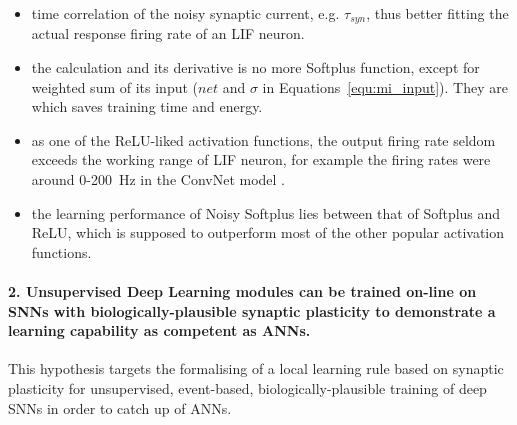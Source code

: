 	\begin{itemize}
		\item \DIFdelbegin {}\DIFdelend \DIFaddbegin {}\DIFaddend time correlation of the noisy synaptic current, e.g. $\tau_{syn}$, thus better fitting the actual response firing rate of an LIF neuron. %


		\item the calculation \DIFdelbegin {}\DIFdelend \DIFaddbegin {}\DIFaddend and its derivative is no more \DIFdelbegin {}\DIFdelend \DIFaddbegin {}\DIFaddend Softplus function, except for \DIFdelbegin {}\DIFdelend \DIFaddbegin {}\DIFaddend weighted sum of its input ($net$ and $\sigma$ in Equations~\ref{equ:mi_input}\DIFdelbegin {}\DIFdelend ).
		They are \DIFdelbegin {}\DIFdelend \DIFaddbegin {}\DIFaddend which saves training time and energy.

		\item as one of the ReLU-liked activation functions, the output firing rate seldom exceeds the working range of \DIFdelbegin {}\DIFdelend \DIFaddbegin {}\DIFaddend LIF neuron, for example the firing rates were around 0-200~Hz in the ConvNet model \DIFaddbegin {}\DIFaddend .

		\item the learning performance of Noisy Softplus lies between that of Softplus and ReLU, which is supposed to outperform most of the other popular activation functions.
	\end{itemize}

\paragraph{2. Unsupervised Deep Learning modules can be trained on-line on SNNs with biologically-plausible synaptic plasticity to demonstrate a learning capability as competent as ANNs.}
This hypothesis targets the formalising of a local learning rule based on synaptic plasticity for unsupervised, event-based, biologically-plausible training of deep SNNs in order to catch up \DIFdelbegin {}\DIFdelend \DIFaddbegin {}\DIFaddend of ANNs.

